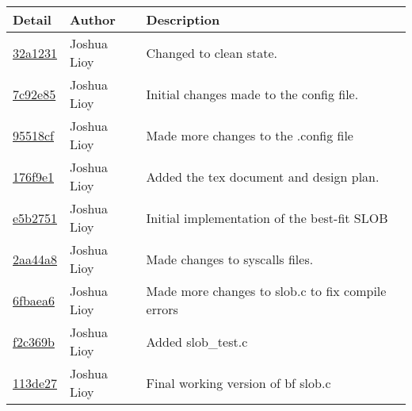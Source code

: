 \begin{tabular}{l l l}\textbf{Detail} & \textbf{Author} & \textbf{Description}\\\hline
\href{https://github.com/jlioy/group11repo/commit/32a12311779e0343d3747af7206d5b09710f27de}{32a1231} & Joshua Lioy & Changed to clean state.\\\hline
\href{https://github.com/jlioy/group11repo/commit/7c92e855b7cb500e9d4d589a63d0be44badad0ed}{7c92e85} & Joshua Lioy & Initial changes made to the config file.\\\hline
\href{https://github.com/jlioy/group11repo/commit/95518cf7b12613b9ae26d50e62ca1b13a76e8041}{95518cf} & Joshua Lioy & Made more changes to the .config file\\\hline
\href{https://github.com/jlioy/group11repo/commit/176f9e1edac99d8a29d5bc62acdb0ba0e8898f74}{176f9e1} & Joshua Lioy & Added the tex document and design plan.\\\hline
\href{https://github.com/jlioy/group11repo/commit/e5b27517b6cdc7151dd51476d7810beca9293f8c}{e5b2751} & Joshua Lioy & Initial implementation of the best-fit SLOB\\\hline
\href{https://github.com/jlioy/group11repo/commit/2aa44a87bf528370134d833a99afc6f50232563c}{2aa44a8} & Joshua Lioy & Made changes to syscalls files.\\\hline
\href{https://github.com/jlioy/group11repo/commit/6fbaea6c103f5103f3349679aea9c6a544862546}{6fbaea6} & Joshua Lioy & Made more changes to slob.c to fix compile errors\\\hline
\href{https://github.com/jlioy/group11repo/commit/f2c369b72df97f0ac983eb42062137a7ff619e87}{f2c369b} & Joshua Lioy & Added slob\_test.c\\\hline
\href{https://github.com/jlioy/group11repo/commit/113de27ff1d29a712c59522538bc7ddd60dc2200}{113de27} & Joshua Lioy & Final working version of bf slob.c\\\hline\end{tabular}

